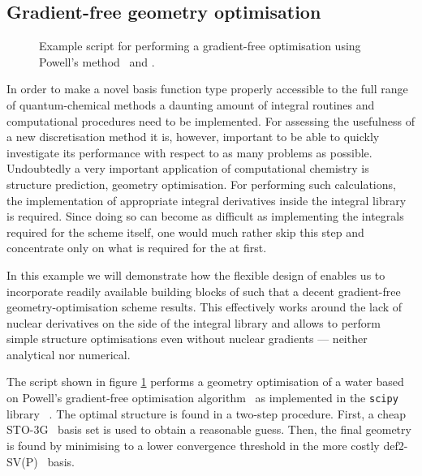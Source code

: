 \subsection{Gradient-free geometry optimisation}
\label{sec:ex:geo}

\begin{figure}
	\centering
	\begin{minipage}{0.58\textwidth}
	
	\end{minipage}
	\caption[\python script for performing gradient-free optimisation]{
		Example \python script for performing a gradient-free optimisation
		using Powell's method~\cite{Powell1964,Press1992} and \molsturm.
	}
	\label{fig:codeGeoOpt}
\end{figure}
\newcommand{\lgbasone}{36\xspace}
\newcommand{\lgbastwo}{41\xspace}

In order to make a novel basis function type properly accessible
to the full range of quantum-chemical methods
a daunting amount of integral routines and computational procedures
need to be implemented.
For assessing the usefulness of a new discretisation method it is, however,
important to be able to quickly investigate its performance with respect to
as many problems as possible.
Undoubtedly a very important application of computational chemistry
is structure prediction, \ie geometry optimisation.
For performing such calculations,
the implementation of appropriate integral derivatives
inside the integral library is required.
Since doing so can become as difficult as implementing the integrals
required for the \SCF scheme itself,
one would much rather skip this step and concentrate
only on what is required for the \SCF at first.

In this example we will demonstrate how the flexible design of \molsturm
enables us to incorporate readily available building blocks of \python
such that a decent gradient-free geometry-optimisation scheme results.
This effectively works around the lack of nuclear derivatives
on the side of the integral library
and allows to perform simple structure optimisations
even without nuclear gradients --- neither analytical nor numerical.

The script shown in figure \ref{fig:codeGeoOpt}
performs a geometry optimisation of a water
based on Powell's gradient-free optimisation algorithm~\cite{Powell1964,Press1992}
as implemented in the \texttt{scipy} library%
~\cite{Walt2011,scipyWeb}.
The optimal structure is found in a two-step procedure.
First, a cheap \mbox{STO-3G}~\cite{Hehre1969} basis set is used to obtain
a reasonable guess.
Then, the final geometry is found
by minimising to a lower convergence threshold in the more costly
\mbox{def2-SV(P)}~\cite{Weigend2005} basis.

